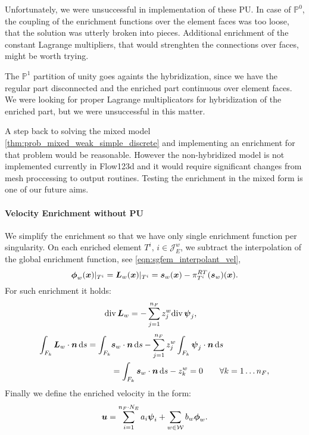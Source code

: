 Unfortunately, we were unsuccessful in implementation of these PU.
In case of $\mathbb P^0$, the coupling of the enrichment functions over the element faces was too loose,
that the solution was utterly broken into pieces.
Additional enrichment of the constant Lagrange multipliers, that would strenghten the connections over faces,
might be worth trying.

The $\mathbb P^1$ partition of unity goes againts the hybridization, since we have the regular part disconnected
and the enriched part continuous over element faces. We were looking for proper Lagrange multiplicators
for hybridization of the enriched part, but we were unsuccessful in this matter.

A step back to solving the mixed model \ref{thm:prob_mixed_weak_simple_discrete} and implementing an enrichment
for that problem would be reasonable. However the non-hybridized model is not implemented currently in Flow123d
and it would require significant changes from mesh proccessing to output routines.
Testing the enrichment in the mixed form is one of our future aims.


\paragraph{Velocity Enrichment without PU}
We simplify the enrichment so that we have only single enrichment function per singularity.
On each enriched element $T^i,\, i\in\mathcal{J}^w_E$, we subtract the interpolation
of the global enrichment function, see \eqref{eqn:sgfem_interpolant_vel},
\begin{equation}
    \mathbf{\boldsymbol{\phi}}_w(\mathbf{\boldsymbol{x}})|_{T^i} = \mathbf{\boldsymbol{L}}_{w}(\mathbf{\boldsymbol{x}})|_{T^i} = \mathbf{\boldsymbol{s}}_w(\mathbf{\boldsymbol{x}}) - \pi^{RT}_{T^i}(\mathbf{\boldsymbol{s}}_w)(\mathbf{\boldsymbol{x}}).
    \label{eqn:local_enr_vel}
\end{equation}
%
For such enrichment it holds:   
\begin{align}
    {\rm div}\,\mathbf{\boldsymbol{L}}_w &= - \sum \limits_{j=1}^{n_F} z^w_j {\rm div}\,\mathbf{\boldsymbol{\psi}}_j,
    \label{eqn:local_enr_vel_div_single}
\end{align}
\begin{align}
    \int_{F_k} \mathbf{\boldsymbol{L}}_w\cdot\mathbf{\boldsymbol{n}} \,{\rm d} s = \int_{F_k} &\mathbf{\boldsymbol{s}}_w\cdot\mathbf{\boldsymbol{n}} \,{\rm d} s
        - \sum \limits_{j=1}^{n_F} z^w_j \int_{F_k} \mathbf{\boldsymbol{\psi}}_j \cdot \mathbf{\boldsymbol{n}} \,{\rm d} s \nonumber\\
    &= \int_{F_k} \mathbf{\boldsymbol{s}}_w\cdot\mathbf{\boldsymbol{n}} \,{\rm d} s - z^w_k = 0 \qquad \forall k=1\ldots n_F
    \label{eqn:local_enr_vel_normal},
\end{align}
%
Finally we define the enriched velocity in the form:
\begin{equation}
    \mathbf{\boldsymbol{u}} = 
    \sum \limits_{i=1}^{n_F\cdot N_E} a_i \mathbf{\boldsymbol{\psi}}_i + 
    \sum \limits_{w\in\mathcal{W}} b_w \mathbf{\boldsymbol{\phi}}_w.
    \label{eqn:velocity_enriched_approximation}
\end{equation}


